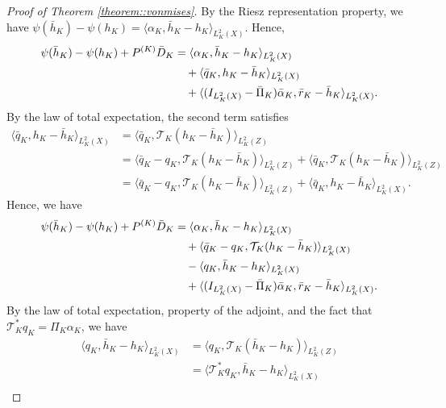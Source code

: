 \documentclass[11pt]{article}
\theoremstyle{plain}
\theoremstyle{definition}
\theoremstyle{remark}
\theoremstyle{definition}
\begin{document}
\begin{proof}[Proof of Theorem \ref{theorem::vonmises}]
 

 
 


By the Riesz representation property, we have $ \psi(\bar{h}_K) - \psi(h_K) =  \langle \alpha_K, \bar h_K -  h_K \rangle_{L_K^2(X)}$. Hence, 
\begin{align}
    \psi(\bar{h}_K) - \psi(h_K) + P^{(K)} \bar D_K 
    &=  \langle \alpha_K, \bar h_K -  h_K \rangle_{L_K^2(X)} \notag \\
    &\quad + \langle \bar q_K, h_K - \bar h_K \rangle_{L_K^2(X)} \notag \\
    &\quad + \langle (I_{L_K^2(X)} - \bar \Pi_K) \bar \alpha_K, \bar r_K - \bar h_K \rangle_{L_K^2(X)}.
\end{align}
By the law of total expectation, the second term satisfies 
\begin{align*}
    \langle \bar q_K, h_K - \bar h_K \rangle_{L_K^2(X)} &= \langle \bar q_K, \mathcal{T}_K(h_K - \bar h_K) \rangle_{L_K^2(Z)}\\
    &= \langle \bar q_K - q_K, \mathcal{T}_K(h_K - \bar h_K) \rangle_{L_K^2(Z)} + \langle \bar q_K, \mathcal{T}_K(h_K - \bar h_K) \rangle_{L_K^2(Z)}\\
     &= \langle \bar q_K - q_K, \mathcal{T}_K(h_K - \bar h_K) \rangle_{L_K^2(Z)} + \langle \bar q_K, h_K - \bar h_K\rangle_{L_K^2(X)}.
\end{align*} 
Hence, we have
\begin{align*}
    \psi(\bar{h}_K) - \psi(h_K) + P^{(K)} \bar D_K 
        &=  \langle \alpha_K,  \bar h_K -  h_K \rangle_{L_K^2(X)} \notag \\
    & \quad + \langle \bar q_K - q_K, \mathcal{T}_K( h_K - \bar h_K ) \rangle_{L_K^2(X)}\notag \\
      & \quad - \langle  q_K, \bar h_K -  h_K \rangle_{L_K^2(X)}\notag \\
    &\quad + \langle (I_{L_K^2(X)} - \bar \Pi_K) \bar \alpha_K, \bar r_K - \bar h_K \rangle_{L_K^2(X)}.
\end{align*}
By the law of total expectation, property of the adjoint, and the fact that $ \mathcal{T}_K^* q_K = \Pi_K \alpha_K$, we have 
\begin{align*}
    \langle  q_K, \bar h_K -  h_K \rangle_{L_K^2(X)} &=  \langle  q_K, \mathcal{T}_K(\bar h_K -  h_K) \rangle_{L_K^2(Z)} \\
    &=  \langle  \mathcal{T}_K^* q_K, \bar h_K -  h_K \rangle_{L_K^2(X)} \\

\end{align*}
\end{proof}
\end{document}
